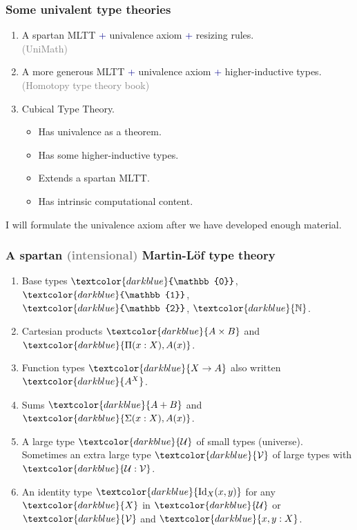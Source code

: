 \documentclass[aspectratio=169]{beamer}
\newcommand{\U}{\operatorname{\mathcal{U}}}
\newcommand{\V}{\operatorname{\mathcal{V}}}
\newcommand{\db}{\textcolor{darkblue}}
\newcommand{\grey}{\textcolor{grey}}
\newcommand{\m}[1]{$\db{#1}$}
\newcommand{\N}{\mathbb{N}}
\newcommand{\Id}{\operatorname{Id}}
\begin{document}
\begin{frame}
  \frametitle{Some univalent type theories}

  \begin{enumerate}
  \vfill \item A spartan MLTT \db{+} univalence axiom \db{+} resizing rules. \\[1ex]
  \grey{(UniMath)}

  \vfill \item A more generous MLTT \db{+} univalence axiom \db{+} higher-inductive types. \\[1ex]
  \grey{(Homotopy type theory book)}

  \vfill \item Cubical Type Theory.\\[1ex]
  \begin{itemize}
  \item  Has univalence as a theorem.
  \item  Has some higher-inductive types.
  \item  Extends a spartan MLTT.
  \item  Has intrinsic computational content.
  \end{itemize}
  \end{enumerate}

  I will formulate the univalence axiom after we have developed enough
  material.

\end{frame}

\begin{frame}
  \frametitle{A spartan \grey{(intensional)} Martin-L\"of type theory}

\vfill

  \begin{enumerate}
  \vfill \item Base types \m{\mathbb{0}}, \m{\mathbb{1}},  \m{\mathbb{2}}, \m{\N}.
  \vfill \item Cartesian products \m{A \times B} and \m{\Pi(x:X), A(x)}.
  \vfill \item Function types \m{X \to A} also written \m{A^X}.
  \vfill \item Sums \m{A + B} and \m{\Sigma(x:X), A(x)}.
  \vfill \item A large type \m{\U} of small types (universe). \\[1ex] Sometimes an extra large type \m{\V} of large types with \m{\U : \V}.
  \vfill \item An identity type \m{\Id_X(x,y)} for any \m{X} in \m{\U} or \m{\V} and \m{x,y:X}.
\end{enumerate}

\vfill

\end{frame}
\end{document}
